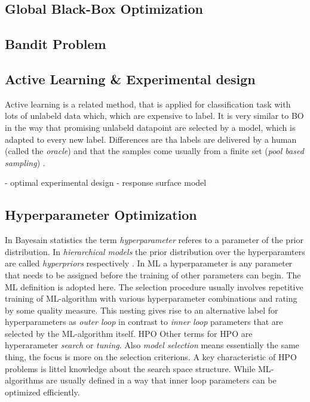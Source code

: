 \documentclass[english]{article}
\begin{document}
\subsection{Global Black-Box Optimization}

\subsection{Bandit Problem}

\subsection{Active Learning \& Experimental design}
Active learning is a related method, that is applied for classification task with lots of unlabeld data which, which are expensive to label. It is very similar to BO in the way that promising unlabeld datapoint are selected by a model, which is adapted to every new label. Differences are tha labels are delivered by a human (called the \textit{oracle}) and that the samples come usually from a finite set (\textit{pool based sampling}) \cite{settles_active_2010}.

 - optimal experimental design
 - response surface model

\subsection{Hyperparameter Optimization}
In Bayesain statistics the term \textit{hyperparameter} referes to a parameter of the prior distribution. In \textit{hierarchical models} the prior distribution over the hyperparamters are called \textit{hyperpriors} respectively \cite[p.408]{bishop_neural_1995}. In \acf{ML} a hyperparameter is any parameter that needs to be assigned before the training of other parameters can begin. The \ac{ML} definition is adopted here. The selection procedure usually involves repetitive training of \ac{ML}-algorithm with various hyperparameter combinations and rating by some quality measure. This nesting gives rise to an alternative label for hyperparameters as \textit{outer loop} in contrast to \textit{inner loop} parameters that are selected by the \ac{ML}-algorithm itself. \acf{HPO} Other terms for \ac{HPO} are hyperarameter \textit{search} or \textit{tuning}.
Also \textit{model selection} means essentially the same thing, the focus is more on the selection criterions.
A key characteristic of \ac{HPO} problems is littel knowledge about the search space structure.  While \ac{ML}-algorithms are usually defined in a way that inner loop parameters can be optimized efficiently.
\end{document}
